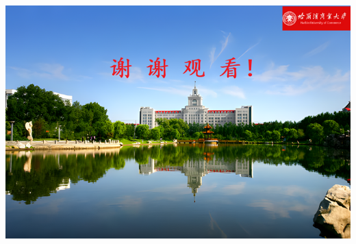 \documentclass[
  11pt,
  ignorenonframetext,
  dvipsnames,UTF8]{beamer}
\newif\ifbibliography
\begin{document}
\begin{frame}{}
\protect\hypertarget{section-51}{}
\begin{center}\includegraphics[width=1\linewidth]{images/hrbcu} \end{center}
\end{frame}

\begin{frame}[allowframebreaks]{}
  \bibliographytrue
  
\end{frame}
\end{document}
